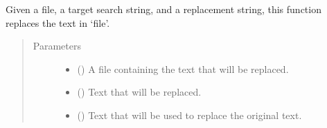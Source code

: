 \documentclass[letterpaper,12pt,english,openany,oneside]{sphinxmanual}
\begin{document}
\begin{fulllineitems}
\label{\detokenize{simulation:simulation.replace}}
Given a file, a target search string, and a replacement string, this function replaces the text in ‘file’.
\begin{quote}\begin{description}
\item[{Parameters}] \leavevmode\begin{itemize}
\item {} 
 () \textendash{} A file containing the text that will be replaced.

\item {} 
 () \textendash{} Text that will be replaced.

\item {} 
 () \textendash{} Text that will be used to replace the original text.

\end{itemize}

\end{description}\end{quote}

\end{fulllineitems}


\begin{fulllineitems}
\label{\detokenize{simulation:simulation.simulate}}
\end{fulllineitems}


\begin{fulllineitems}
\label{\detokenize{simulation:simulation.solvate}}
\end{fulllineitems}
\end{document}
